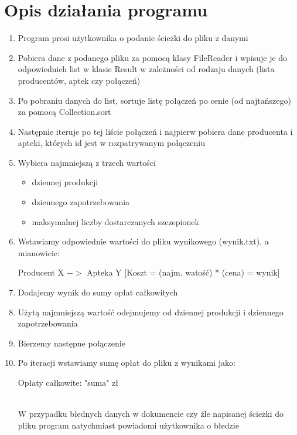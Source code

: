 \documentclass{article}
\begin{document}
\section{Opis działania programu}
    \begin{enumerate}
        \item Program prosi użytkownika o podanie ścieżki do pliku z danymi
        \item Pobiera dane z podanego pliku za pomocą klasy FileReader i wpisuje je do odpowiednich list w klasie Result w zależności od rodzaju danych (lista producentów, aptek czy połączeń)
        \item Po pobraniu danych do list, sortuje listę połączeń po cenie (od najtańszego) za pomocą Collection.sort
        \item Następnie iteruje po tej liście połączeń i najpierw pobiera dane producenta i apteki, których id jest w rozpatrywanym połączeniu
        \item Wybiera najmniejszą z trzech wartości 
        \begin{itemize}
            \item dziennej produkcji
            \item dziennego zapotrzebowania
            \item maksymalnej liczby dostarczanych szczepionek
        \end{itemize}
        \item Wstawiamy odpowiednie wartości do pliku wynikowego (wynik.txt), a mianowicie:
            \begin{tcolorbox}
                 Producent X $->$ Apteka Y [Koszt = (najm. watość) * (cena) = wynik]
            \end{tcolorbox}
        \item Dodajemy wynik do sumy opłat całkowitych
        \item Użytą najmniejszą wartość odejmujemy od dziennej produkcji i dziennego zapotrzebowania
        \item Bierzemy następne połączenie
        \item Po iteracji wstawiamy sumę opłat do pliku z wynikami jako: 
            \begin{tcolorbox}
                Opłaty całkowite: "suma" zł
            \end{tcolorbox}
        \\ W przypadku błednych danych w dokumencie czy źle napisanej ścieżki do pliku program natychmiast powiadomi użytkownika o błedzie
    \end{enumerate}
\end{document}
